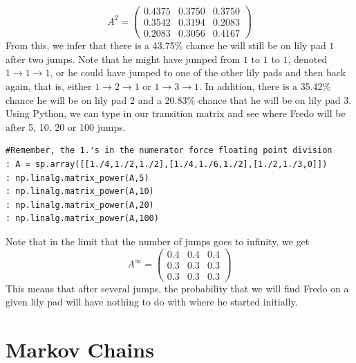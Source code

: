 \[
A^2 = \begin{pmatrix}
0.4375 & 0.3750 & 0.3750\\
0.3542 & 0.3194 & 0.2083\\
0.2083 & 0.3056 & 0.4167
\end{pmatrix}
\]
From this, we infer that there is a 43.75\% chance he will still be on lily pad $1$ after two jumps.  Note that he might have jumped from $1$ to $1$ to $1$, denoted $1 \rightarrow 1 \rightarrow 1$, or he could have jumped to one of the other lily pads and then back again, that is, either $1 \rightarrow 2 \rightarrow 1$ or $1 \rightarrow 3 \rightarrow 1$.  In addition, there is a 35.42\% chance he will be on lily pad $2$ and a 20.83\% chance that he will be on lily pad $3$.  Using Python, we can type in our transition matrix and see where Fredo will be after 5, 10, 20 or 100 jumps.

\begin{lstlisting}[style=python]
#Remember, the 1.'s in the numerator force floating point division
: A = sp.array([[1./4,1./2,1./2],[1./4,1./6,1./2],[1./2,1./3,0]])
: np.linalg.matrix_power(A,5)
: np.linalg.matrix_power(A,10)
: np.linalg.matrix_power(A,20)
: np.linalg.matrix_power(A,100)
\end{lstlisting}

Note that in the limit that the number of jumps goes to infinity, we get
\[
A^\infty = \begin{pmatrix}
0.4 & 0.4 & 0.4\\
0.3 & 0.3 & 0.3\\
0.3 & 0.3 & 0.3
\end{pmatrix}
\]
This means that after several jumps, the probability that we will find Fredo on a given lily pad will have nothing to do with where he started initially.
 
\section*{Markov Chains}

